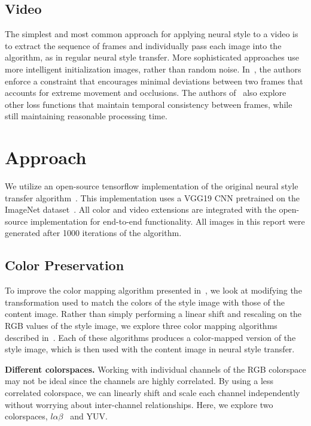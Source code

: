 \documentclass[10pt,twocolumn,letterpaper]{article}
\begin{document}
\subsection{Video}
The simplest and most common approach for applying neural style to a video is to extract the sequence of frames and individually pass each image into the algorithm, as in regular neural style transfer. More sophisticated approaches use more intelligent initialization images, rather than random noise. In~\cite{video1}, the authors enforce a constraint that encourages minimal deviations between two frames that accounts for extreme movement and occlusions. The authors of~\cite{video2} also explore other loss functions that maintain temporal consistency between frames, while still maintaining reasonable processing time.

\section{Approach}
We utilize an open-source tensorflow implementation of the original neural style transfer algorithm~\cite{neuralstyle}. This implementation uses a VGG19 CNN pretrained on the ImageNet dataset~\cite{vgg}. All color and video extensions are integrated with the open-source implementation for end-to-end functionality. All images in this report were generated after 1000 iterations of the algorithm.

\subsection{Color Preservation}
To improve the color mapping algorithm presented in~\cite{gatys-color}, we look at modifying the transformation used to match the colors of the style image with those of the content image. Rather than simply performing a linear shift and rescaling on the RGB values of the style image, we explore three color mapping algorithms described in~\cite{color}. Each of these algorithms produces a color-mapped version of the style image, which is then used with the content image in neural style transfer.

\bigbreak\noindent\textbf{Different colorspaces.}
Working with individual channels of the RGB colorspace may not be ideal since the channels are highly correlated. By using a less correlated colorspace, we can linearly shift and scale each channel independently without worrying about inter-channel relationships. Here, we explore two colorspaces, $l\alpha\beta$~\cite{lab} and YUV.
\end{document}
